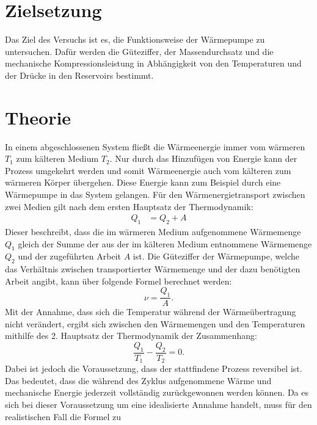 
\section{Zielsetzung}
Das Ziel des Versuchs ist es, die Funktionsweise der Wärmepumpe zu untersuchen.
Dafür werden die Güteziffer, der Massendurchsatz und die mechanische Kompressionsleistung
in Abhängigkeit von den Temperaturen und der Drücke in den Reservoirs bestimmt.
\section{Theorie}
In einem abgeschlossenen System fließt die Wärmeenergie immer vom wärmeren $T_1$
zum kälteren Medium $T_2$. Nur durch das Hinzufügen von Energie kann der Prozess
umgekehrt werden und somit Wärmeenergie auch vom kälteren zum wärmeren Körper übergehen.
Diese Energie kann zum Beispiel durch eine Wärmepumpe in das System gelangen.
\newline
Für den Wärmenergietransport zwischen zwei Medien gilt nach dem ersten Hauptsatz der Thermodynamik:
\begin{align}
  Q_1          &= Q_2 + A   \label{eqn:HS1}
\end{align}
Dieser beschreibt, dass die im wärmeren Medium aufgenommene Wärmemenge $Q_1$ gleich
der Summe der aus der im kälteren Medium entnommene Wärmemenge $Q_2$ und der zugeführten Arbeit $A$ ist.
Die Güteziffer der Wärmepumpe, welche das Verhältnis zwischen transportierter Wärmemenge
und der dazu benötigten Arbeit angibt, kann über folgende Formel berechnet werden:
\begin{equation}
  \nu = \frac{Q_1}{A}.
\end{equation}
Mit der Annahme, dass sich die Temperatur während der Wärmeübertragung nicht verändert, ergibt sich
zwischen den Wärmemengen und den Temperaturen mithilfe des 2. Hauptsatz der Thermodynamik der Zusammenhang:
\begin{equation}
  \label{eqn:HS2}
  \frac{Q_1}{T_1} - \frac{Q_2}{T_2} = 0.
\end{equation}
Dabei ist jedoch die Voraussetzung, dass der stattfindene Prozess reversibel ist.
Das bedeutet, dass die während des Zyklus aufgenommene Wärme und mechanische Energie jederzeit
vollständig zurückgewonnen werden können. Da es sich bei dieser Voraussetzung um eine idealisierte
Annahme handelt, muss für den realistischen Fall die Formel zu

